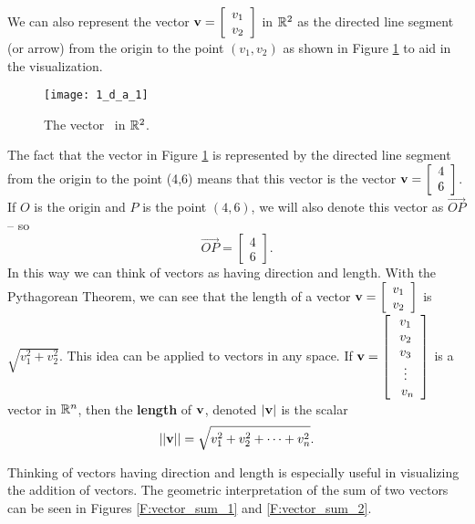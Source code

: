 We can also represent the vector $\mathbf{v} = \left[ \begin{array}{c} v_1\\ v_2\end{array} \right] $ in $\mathbb{R}^2$ as the directed line segment (or arrow) from the origin to the point $(v_1, v_2)$ as shown in Figure \ref{F:Vector1} to aid in the visualization. 
\begin{figure}[ht] \centering
\texttt{[image: 1\_d\_a\_1]}
\caption{The vector~\usebox{\smlmat} in $\mathbb{R}^2$.}
\label{F:Vector1}
\end{figure}

The fact that the vector in Figure \ref{F:Vector1} is represented by the directed line segment from the origin to the point (4,6) means that this vector is the vector $\mathbf{v} = \left[ \begin{array}{c} 4\\ 6\end{array} \right] $. If $O$ is the origin and $P$ is the point $(4,6)$, we will also denote this vector as $\overrightarrow{OP}$ -- so
\[\overrightarrow{OP} = \left[ \begin{array}{c} 4\\ 6\end{array} \right] .\]
In this way we can think of vectors as having direction and length. With the Pythagorean Theorem, we can see that the length of a vector $\mathbf{v} = \left[ \begin{array}{c} v_1\\v_2 \end{array} \right]$ is $\sqrt{v_1^2+v_2^2}$. This idea can be applied to vectors in any space. If $\mathbf{v} = \left[ \begin{array}{c} v_1 \\ v_2 \\ v_3 \\ \vdots \\ \ v_n \end{array} \right]$ is a vector in $\mathbb{R}^n$, then the \textbf{length} of $\mathbf{v}$, denoted $|\mathbf{v}|$ is the scalar 
\[||\mathbf{v}|| = \sqrt{v_1^2+v_2^2+ \cdots + v_n^2}.\]



Thinking of vectors having direction and length is especially useful in visualizing the addition of vectors. The geometric interpretation of the sum of two vectors can be seen in Figures \ref{F:vector_sum_1} and \ref{F:vector_sum_2}.


